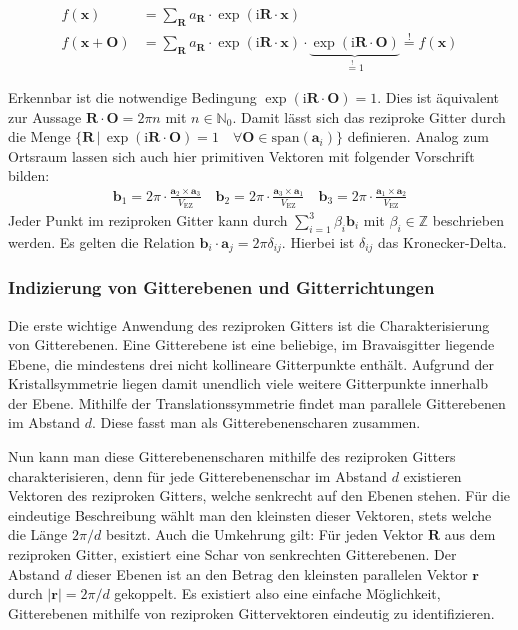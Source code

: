 \begin{align*}
    f(\mathbf{x})&=\sum_{\mathbf{R}}a_{\mathbf{R}}\cdot \exp(\mathrm{i}\mathbf{R}\cdot\mathbf{x}) \\
    f(\mathbf{x}+\mathbf{O})&=\sum_{\mathbf{R}}a_{\mathbf{R}}\cdot \exp(\mathrm{i}\mathbf{R}\cdot \mathbf{x})\cdot
    \underbrace{ \exp(\mathrm{i}\mathbf{R}\cdot \mathbf{O}) }_{ \stackrel{!}{=}1 }  \stackrel{!}{=} f(\mathbf{x})
\end{align*}

Erkennbar ist die notwendige Bedingung $\exp(\mathrm{i}\mathbf{R}\cdot \mathbf{O})=1$.
Dies ist äquivalent zur Aussage $\mathbf{R}\cdot \mathbf{O}=2\pi n$ mit $n \in \mathbb{N}_{0}$.
Damit lässt sich das reziproke Gitter durch die Menge
$\{ \mathbf{R} \,\vert\, \exp(\mathrm{i}\mathbf{R}\cdot \mathbf{O})=1 \quad
\forall \mathbf{O} \in \text{span}(\mathbf{a}_{i}) \}$ definieren. \autocite[108]{Ashcroft}
Analog zum Ortsraum lassen sich auch hier primitiven Vektoren mit folgender Vorschrift bilden:
\begin{align*}
    \mathbf{b}_{1} = 2\pi \cdot \frac{\mathbf{a}_{2} \times \mathbf{a}_{3}}{V_{\mathrm{EZ}}} \quad
    \mathbf{b}_{2} = 2\pi \cdot \frac{\mathbf{a}_{3} \times \mathbf{a}_{1}}{V_{\mathrm{EZ}}} \quad
    \mathbf{b}_{3} = 2\pi \cdot \frac{\mathbf{a}_{1} \times \mathbf{a}_{2}}{V_{\mathrm{EZ}}}
\end{align*}
Jeder Punkt im reziproken Gitter kann durch $\sum_{i=1}^{3} \beta_{i}\mathbf{b}_{i}$ mit $\beta_i \in \mathbb{Z}
$ beschrieben werden.
Es gelten die Relation $\mathbf{b}_{i}\cdot \mathbf{a}_{j}=2 \pi \delta_{ij}$.
Hierbei ist $\delta_{ij}$ das Kronecker-Delta.
\autocite[109]{Ashcroft}

\subsubsection{Indizierung von Gitterebenen und Gitterrichtungen}
Die erste wichtige Anwendung des reziproken Gitters ist die Charakterisierung von Gitterebenen.
Eine Gitterebene ist eine beliebige, im Bravaisgitter liegende Ebene, die mindestens drei nicht kollineare Gitterpunkte
enthält.
Aufgrund der Kristallsymmetrie liegen damit unendlich viele weitere Gitterpunkte innerhalb der Ebene.
Mithilfe der Translationssymmetrie findet man parallele Gitterebenen im Abstand $d$.
Diese fasst man als Gitterebenenscharen zusammen.

Nun kann man diese Gitterebenenscharen mithilfe des reziproken Gitters charakterisieren, denn für jede
Gitterebenenschar im Abstand $d$ existieren Vektoren des reziproken Gitters, welche senkrecht auf den Ebenen stehen.
Für die eindeutige Beschreibung wählt man den kleinsten dieser Vektoren, stets welche die Länge $2 \pi / d$ besitzt.
Auch die Umkehrung gilt: Für jeden Vektor $\mathbf{R}$ aus dem reziproken Gitter, existiert eine Schar von senkrechten
Gitterebenen.
Der Abstand $d$ dieser Ebenen ist an den Betrag den kleinsten parallelen Vektor $\mathbf{r}$ durch $\lvert \mathbf{r}
\rvert=2\pi  /d$ gekoppelt.
Es existiert also eine einfache Möglichkeit, Gitterebenen mithilfe von reziproken Gittervektoren eindeutig zu
identifizieren. \autocite[113]{Ashcroft}

